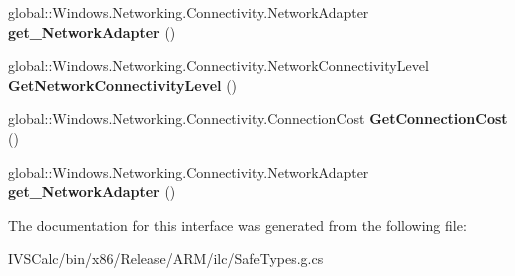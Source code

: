 \begin{DoxyCompactItemize}
global\+::\+Windows.\+Networking.\+Connectivity.\+Network\+Adapter {\bfseries get\+\_\+\+Network\+Adapter} ()
\item 
\mbox{\label{interface_windows_1_1_networking_1_1_connectivity_1_1_i_connection_profile_a8419d8432ed57c0bd7560b426edf602f}} 
global\+::\+Windows.\+Networking.\+Connectivity.\+Network\+Connectivity\+Level {\bfseries Get\+Network\+Connectivity\+Level} ()
\item 
\mbox{\label{interface_windows_1_1_networking_1_1_connectivity_1_1_i_connection_profile_a17f76f7b6e209095ea713f00343d03cb}} 
global\+::\+Windows.\+Networking.\+Connectivity.\+Connection\+Cost {\bfseries Get\+Connection\+Cost} ()
\item 
\mbox{\label{interface_windows_1_1_networking_1_1_connectivity_1_1_i_connection_profile_a7ff1cc52f1dd6c6f6110d0e5fe5f29df}} 
global\+::\+Windows.\+Networking.\+Connectivity.\+Network\+Adapter {\bfseries get\+\_\+\+Network\+Adapter} ()
\end{DoxyCompactItemize}


The documentation for this interface was generated from the following file\+:\begin{DoxyCompactItemize}
\item 
I\+V\+S\+Calc/bin/x86/\+Release/\+A\+R\+M/ilc/Safe\+Types.\+g.\+cs\end{DoxyCompactItemize}
